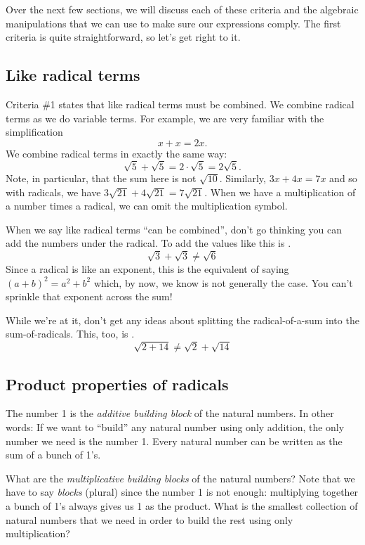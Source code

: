 Over the next few sections, we will discuss each of these criteria and the algebraic manipulations that we can use to make sure our expressions comply. The first criteria is quite straightforward, so let's get right to it.

\subsection{Like radical terms}

Criteria \#1 states that like radical terms must be combined. We combine radical terms as we do variable terms. For example, we are very familiar with the simplification \[x + x = 2x.\] We combine radical terms in exactly the same way: \[\sqrt5 + \sqrt5 = 2\cdot\sqrt5 = 2\sqrt5.\]
Note, in particular, that the sum here is not $\sqrt{10}$. Similarly, $3x + 4x = 7x$ and so with radicals, we have $3\sqrt{21} + 4\sqrt{21} = 7\sqrt{21}$. When we have a multiplication of a number times a radical, we can omit the multiplication symbol.


\begin{boxedwarning}
When we say like radical terms ``can be combined'', don't go thinking you can add the numbers under the radical. To add the values like this is \evilandwrong.
\[ \sqrt{3} + \sqrt{3} \neq \sqrt{6}\]
Since a radical is like an exponent, this is the equivalent of saying $(a+b)^2=a^2+b^2$ which, by now, we know is not generally the case. You can't sprinkle that exponent across the sum!

While we're at it, don't get any ideas about splitting the radical-of-a-sum into the sum-of-radicals. This, too, is \evilandwrong.
\[\sqrt{2+14} \neq \sqrt{2} +\sqrt{14}\]
\end{boxedwarning}


\subsection{Product properties of radicals}

\begin{boxedexplore}
The number 1 is the \textit{additive building block} of the natural numbers. In other words: If we want to ``build'' any natural number using only addition, the only number we need is the number 1. Every natural number can be written as the sum of a bunch of 1's.

What are the \textit{multiplicative building blocks} of the natural numbers? Note that we have to say \textit{blocks} (plural) since the number 1 is not enough: multiplying together a bunch of 1's always gives us 1 as the product. What is the smallest collection of natural numbers that we need in order to build the rest using only multiplication?
\end{boxedexplore}

